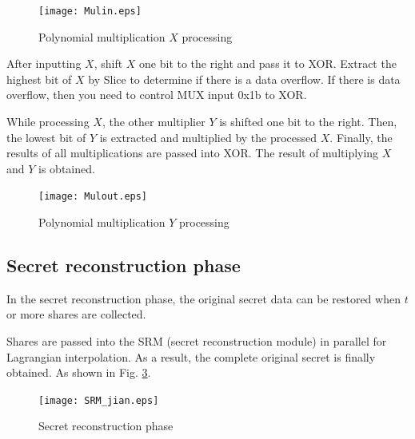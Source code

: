 \begin{figure}[!htb]
	\begin{center}
		\texttt{[image: Mulin.eps]}\\
		\caption{Polynomial multiplication $X$ processing}
		\label{fig08}
		\vspace{-1.0em}
	\end{center}
\end{figure}

After inputting $X$, shift $X$ one bit to the right and pass it to XOR. Extract the highest bit of $X$ by Slice to determine if there is a data overflow. If there is data overflow, then you need to control MUX input 0x1b to XOR.

While processing $X$, the other multiplier $Y$ is shifted one bit to the right. Then, the lowest bit of $Y$ is extracted and multiplied by the processed $X$. Finally, the results of all multiplications are passed into XOR. The result of multiplying $X$ and $Y$ is obtained.

\begin{figure}[!htb]
	\begin{center}
		\texttt{[image: Mulout.eps]}\\
		\caption{Polynomial multiplication $Y$ processing}
		\label{fig09}
		\vspace{-2.0em}
	\end{center}
\end{figure}

\subsection{Secret reconstruction phase}\label{subsec_NC-BPDVC_framework}

In the secret reconstruction phase, the original secret data can be restored when $t$ or more shares are collected.

Shares are passed into the SRM (secret reconstruction module) in parallel for Lagrangian interpolation. As a result, the complete original secret is finally obtained. As shown in Fig. \ref{fig10}.

\begin{figure}
	\begin{center}
		\texttt{[image: SRM\_jian.eps]}
		\caption{{\color{red}Secret reconstruction phase}}
		\label{fig10}       %
		\vspace{-2.0em}
	\end{center}
\end{figure}
